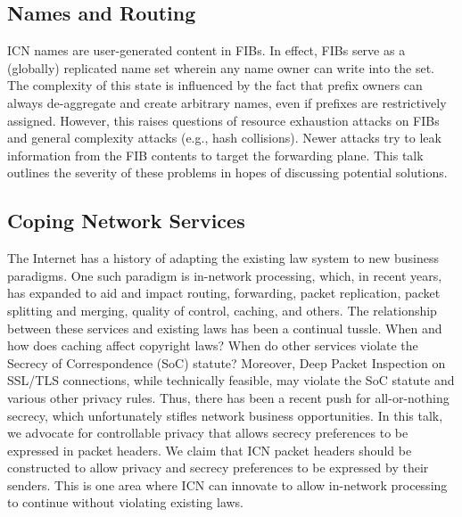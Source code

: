\subsection{Names and Routing}
ICN names are user-generated content in FIBs. In effect, FIBs serve as a (globally)
replicated name set wherein any name owner can write into the set. The complexity of
this state is influenced by the fact that prefix owners can always de-aggregate and
create arbitrary names, even if prefixes are restrictively assigned. However, this
raises questions of resource exhaustion attacks on FIBs and general complexity
attacks (e.g., hash collisions). Newer attacks try to leak information from the
FIB contents to target the forwarding plane. This talk outlines the severity of
these problems in hopes of discussing potential solutions.

\subsection{Coping Network Services}
The Internet has a history of adapting the existing law system to new business paradigms.
One such paradigm is in-network processing, which, in recent years, has expanded to
aid and impact routing, forwarding, packet replication, packet splitting and merging,
quality of control, caching, and others. The relationship between these services and
existing laws has been a continual tussle. When and how does caching affect copyright laws?
When do other services violate the Secrecy of Correspondence (SoC) statute?
Moreover, Deep Packet Inspection on SSL/TLS connections, while technically feasible, may violate
the SoC statute and various other privacy rules. Thus, there has been a recent push for
all-or-nothing secrecy, which unfortunately stifles network business opportunities.
In this talk, we advocate for controllable privacy that allows secrecy preferences to be
expressed in packet headers. We claim that ICN packet headers should be constructed to allow
privacy and secrecy preferences to be expressed by their senders. This is one area where ICN
can innovate to allow in-network processing to continue without violating existing laws.
